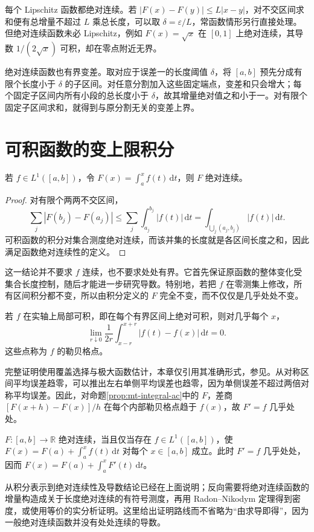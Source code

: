 \documentclass[UTF8,12pt,a4paper,fontset=fandol]{ctexbook}
\begin{document}
每个 Lipschitz 函数都绝对连续。若 $|F(x)-F(y)|\leq L|x-y|$，对不交区间求和便有总增量不超过 $L$ 乘总长度，可以取 $\delta=\varepsilon/L$，常函数情形另行直接处理。但绝对连续函数未必 Lipschitz，例如 $F(x)=\sqrt{x}$ 在 $[0,1]$ 上绝对连续，其导数 $1/(2\sqrt{x})$ 可积，却在零点附近无界。

绝对连续函数也有界变差。取对应于误差一的长度阈值 $\delta$，将 $[a,b]$ 预先分成有限个长度小于 $\delta$ 的子区间。对任意分割加入这些固定端点，变差和只会增大；每个固定子区间内所有小段的总长度小于 $\delta$，故其增量绝对值之和小于一。对有限个固定子区间求和，就得到与原分割无关的变差上界。

\section{可积函数的变上限积分}
\begin{proposition}
若 $f\in L^1([a,b])$，令 $F(x)=\int_a^xf(t)\,\mathrm dt$，则 $F$ 绝对连续。
\label{prop:mt-integral-ac}
\end{proposition}
\begin{proof}
对有限个两两不交区间，
\[
 \sum_j|F(b_j)-F(a_j)|
 \leq\sum_j\int_{a_j}^{b_j}|f(t)|\,\mathrm dt
 =\int_{\bigcup_j(a_j,b_j)}|f(t)|\,\mathrm dt.
\]
可积函数的积分对集合测度绝对连续，而该并集的长度就是各区间长度之和，因此满足函数绝对连续性的定义。
\end{proof}
这一结论并不要求 $f$ 连续，也不要求处处有界。它首先保证原函数的整体变化受集合长度控制，随后才能进一步研究导数。特别地，若把 $f$ 在零测集上修改，所有区间积分都不变，所以由积分定义的 $F$ 完全不变，而不仅仅是几乎处处不变。

\begin{theorem}[勒贝格微分定理的一维形式，引用]
若 $f$ 在实轴上局部可积，即在每个有界区间上绝对可积，则对几乎每个 $x$，
\[
 \lim_{r\downarrow0}\frac1{2r}\int_{x-r}^{x+r}|f(t)-f(x)|\,\mathrm dt=0.
\]
这些点称为 $f$ 的勒贝格点。
\label{thm:mt-lebesgue-differentiation}
\end{theorem}
完整证明使用覆盖选择与极大函数估计，本章仅引用其准确形式，参见\cite[第22--23讲]{mit-measure}。从对称区间平均误差趋零，可以推出左右单侧平均误差也趋零，因为单侧误差不超过两倍对称平均误差。因此，对命题\ref{prop:mt-integral-ac}中的 $F$，差商
$[F(x+h)-F(x)]/h$ 在每个内部勒贝格点趋于 $f(x)$，故 $F'=f$ 几乎处处。

\begin{theorem}[绝对连续函数的积分表示，引用]
$F:[a,b]\to\mathbb R$ 绝对连续，当且仅当存在 $f\in L^1([a,b])$，使
$F(x)=F(a)+\int_a^xf(t)\,\mathrm dt$ 对每个 $x\in[a,b]$ 成立。此时 $F'=f$ 几乎处处，因而
$F(x)=F(a)+\int_a^xF'(t)\,\mathrm dt$。
\end{theorem}
从积分表示到绝对连续性及导数结论已经在上面说明；反向需要将绝对连续函数的增量构造成关于长度绝对连续的有符号测度，再用 Radon--Nikodym 定理得到密度，或使用等价的实分析证明。这里给出证明路线而不省略为“由求导即得”，因为一般绝对连续函数并没有处处连续的导数。
\end{document}
